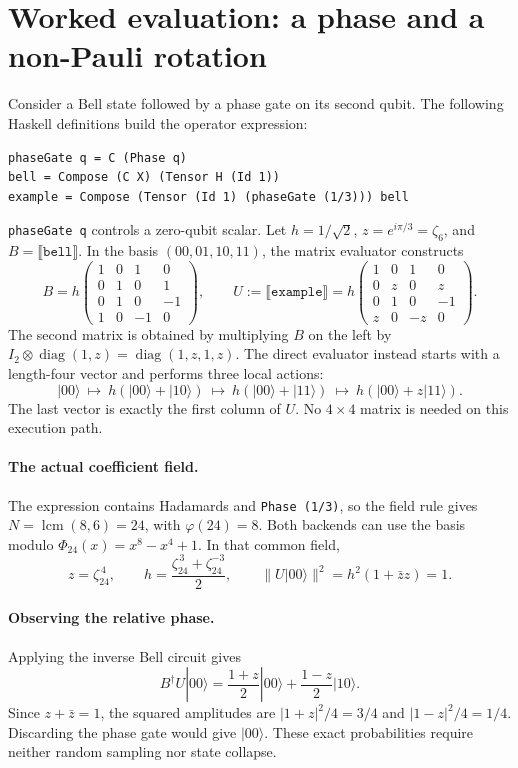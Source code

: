 \documentclass[11pt,a4paper]{article}
\newcommand{\sem}[1]{\llbracket #1\rrbracket}
\newcommand{\code}[1]{\texttt{#1}}
\newcommand{\ket}[1]{|#1\rangle}
\DeclareMathOperator{\lcm}{lcm}
\DeclareMathOperator{\diag}{diag}
\begin{document}
\section{Worked evaluation: a phase and a non-Pauli rotation}
\label{sec:example}
Consider a Bell state followed by a phase gate on its second qubit.
The following Haskell definitions build the operator expression:
\begin{lstlisting}
phaseGate q = C (Phase q)
bell = Compose (C X) (Tensor H (Id 1))
example = Compose (Tensor (Id 1) (phaseGate (1/3))) bell
\end{lstlisting}
\code{phaseGate q} controls a zero-qubit scalar. Let $h=1/\sqrt2$,
$z=e^{i\pi/3}=\zeta_6$, and
$B=\sem{\code{bell}}$. In the basis $(00,01,10,11)$, the matrix evaluator
constructs
\[
B=h\begin{pmatrix}
1&0&1&0\\0&1&0&1\\0&1&0&-1\\1&0&-1&0
\end{pmatrix},\qquad
U:=\sem{\code{example}}
=h\begin{pmatrix}
1&0&1&0\\0&z&0&z\\0&1&0&-1\\z&0&-z&0
\end{pmatrix}.
\]
The second matrix is obtained by multiplying $B$ on the left by
$I_2\otimes\diag(1,z)=\diag(1,z,1,z)$.
The direct evaluator instead starts with a length-four vector and performs
three local actions:
\begin{equation}
\ket{00}
\ \longmapsto\ h(\ket{00}+\ket{10})
\ \longmapsto\ h(\ket{00}+\ket{11})
\ \longmapsto\ h(\ket{00}+z\ket{11}).
\label{eq:bell}
\end{equation}
The last vector is exactly the first column of $U$. No $4\times4$ matrix
is needed on this execution path.

\paragraph{The actual coefficient field.}
The expression contains Hadamards and \code{Phase (1/3)}, so the field
rule gives $N=\lcm(8,6)=24$, with $\varphi(24)=8$.
Both backends can use the basis modulo $\Phi_{24}(x)=x^8-x^4+1$.
In that common field,
\[
z=\zeta_{24}^{\,4},\qquad
h=\frac{\zeta_{24}^{\,3}+\zeta_{24}^{-3}}2,\qquad
\|U\ket{00}\|^2=h^2(1+\bar z z)=1.
\]

\paragraph{Observing the relative phase.}
Applying the inverse Bell circuit gives
\[
B^\dagger U\ket{00}
 =\frac{1+z}{2}\ket{00}+\frac{1-z}{2}\ket{10}.
\]
Since $z+\bar z=1$, the squared amplitudes are
$|1+z|^2/4=3/4$ and $|1-z|^2/4=1/4$.
Discarding the phase gate would give $\ket{00}$. These exact probabilities
require neither random sampling nor state collapse.
\end{document}
